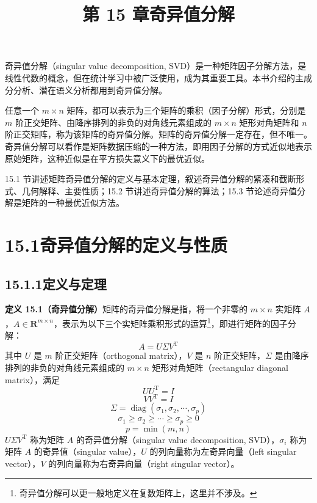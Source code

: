 \documentclass[UTF8, 12pt, fontset=fandol, oneside]{ctexart}
\title{第 15 章\quad 奇异值分解}
\author{}
\date{}
\begin{document}
\maketitle

奇异值分解（singular value decomposition, SVD）是一种矩阵因子分解方法，是线性代数的概念，但在统计学习中被广泛使用，成为其重要工具。本书介绍的主成分分析、潜在语义分析都用到奇异值分解。

任意一个 $m\times n$ 矩阵，都可以表示为三个矩阵的乘积（因子分解）形式，分别是 $m$ 阶正交矩阵、由降序排列的非负的对角线元素组成的 $m\times n$ 矩形对角矩阵和 $n$ 阶正交矩阵，称为该矩阵的奇异值分解。矩阵的奇异值分解一定存在，但不唯一。奇异值分解可以看作是矩阵数据压缩的一种方法，即用因子分解的方式近似地表示原始矩阵，这种近似是在平方损失意义下的最优近似。

15.1 节讲述矩阵奇异值分解的定义与基本定理，叙述奇异值分解的紧凑和截断形式、几何解释、主要性质；15.2 节讲述奇异值分解的算法；15.3 节论述奇异值分解是矩阵的一种最优近似方法。

\section*{15.1\quad 奇异值分解的定义与性质}

\subsection*{15.1.1\quad 定义与定理}

\noindent\textbf{定义 15.1（奇异值分解）}\quad 矩阵的奇异值分解是指，将一个非零的 $m\times n$ 实矩阵 $A$，$A\in\mathbf{R}^{m\times n}$，表示为以下三个实矩阵乘积形式的运算\footnote{奇异值分解可以更一般地定义在复数矩阵上，这里并不涉及。}，即进行矩阵的因子分解：
\begin{equation}
A=U\Sigma V^{\mathrm{T}}
\tag{15.1}
\end{equation}
其中 $U$ 是 $m$ 阶正交矩阵（orthogonal matrix），$V$ 是 $n$ 阶正交矩阵，$\Sigma$ 是由降序排列的非负的对角线元素组成的 $m\times n$ 矩形对角矩阵（rectangular diagonal matrix），满足
\[
UU^{\mathrm{T}}=I
\]
\[
VV^{\mathrm{T}}=I
\]
\[
\Sigma=\operatorname{diag}(\sigma_1,\sigma_2,\cdots,\sigma_p)
\]
\[
\sigma_1\geqslant\sigma_2\geqslant\cdots\geqslant\sigma_p\geqslant0
\]
\[
p=\min(m,n)
\]
$U\Sigma V^{\mathrm{T}}$ 称为矩阵 $A$ 的奇异值分解（singular value decomposition, SVD），$\sigma_i$ 称为矩阵 $A$ 的奇异值（singular value），$U$ 的列向量称为左奇异向量（left singular vector），$V$ 的列向量称为右奇异向量（right singular vector）。
\end{document}
